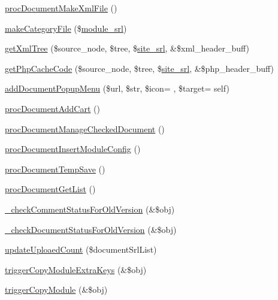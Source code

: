 \begin{DoxyCompactItemize}
\item 
\hyperlink{classdocumentController_a749d60be23e4645a5656a82a4fae1962}{proc\+Document\+Make\+Xml\+File} ()
\item 
\hyperlink{classdocumentController_a75dc24adc286b03e6eeb23eb7f771d8f}{make\+Category\+File} (\$\hyperlink{ko_8install_8php_a370bb6450fab1da3e0ed9f484a38b761}{module\+\_\+srl})
\item 
\hyperlink{classdocumentController_ad18d5e7c2cfbef82020548e13e00df7d}{get\+Xml\+Tree} (\$source\+\_\+node, \$tree, \$\hyperlink{ko_8install_8php_a8b1406b4ad1048041558dce6bfe89004}{site\+\_\+srl}, \&\$xml\+\_\+header\+\_\+buff)
\item 
\hyperlink{classdocumentController_a0e0c1eb0506e936703b6b2b4ed958e5f}{get\+Php\+Cache\+Code} (\$source\+\_\+node, \$tree, \$\hyperlink{ko_8install_8php_a8b1406b4ad1048041558dce6bfe89004}{site\+\_\+srl}, \&\$php\+\_\+header\+\_\+buff)
\item 
\hyperlink{classdocumentController_a763e7cfbb01e26e7b0adaf0d25ff9373}{add\+Document\+Popup\+Menu} (\$url, \$str, \$icon= \textquotesingle{}\textquotesingle{}, \$target= \textquotesingle{}self\textquotesingle{})
\item 
\hyperlink{classdocumentController_a9072167f6533f269be32a0a43e147dae}{proc\+Document\+Add\+Cart} ()
\item 
\hyperlink{classdocumentController_a96dee41cd75a387fee93375d33633aba}{proc\+Document\+Manage\+Checked\+Document} ()
\item 
\hyperlink{classdocumentController_aede408d35ea6622dfa1b39ec52f84e44}{proc\+Document\+Insert\+Module\+Config} ()
\item 
\hyperlink{classdocumentController_a65e4d6ef48c59e92bf82e8ced4b85d4d}{proc\+Document\+Temp\+Save} ()
\item 
\hyperlink{classdocumentController_a23cf92fe7c204813d12c5996360cd939}{proc\+Document\+Get\+List} ()
\item 
\hyperlink{classdocumentController_a3fad5f9653c0ca05bcb1a63a24c318cf}{\+\_\+check\+Comment\+Status\+For\+Old\+Version} (\&\$obj)
\item 
\hyperlink{classdocumentController_ad0d7bdcafe22b9f7ee8f5ae072f3f146}{\+\_\+check\+Document\+Status\+For\+Old\+Version} (\&\$obj)
\item 
\hyperlink{classdocumentController_a2e3e591a2262e0fffc195456248b89ff}{update\+Uploaed\+Count} (\$document\+Srl\+List)
\item 
\hyperlink{classdocumentController_a5e03be29c7b61f87658b604ba80daa88}{trigger\+Copy\+Module\+Extra\+Keys} (\&\$obj)
\item 
\hyperlink{classdocumentController_a612ee2c47ff03e76f6e86fa31ff098a7}{trigger\+Copy\+Module} (\&\$obj)
\end{DoxyCompactItemize}
